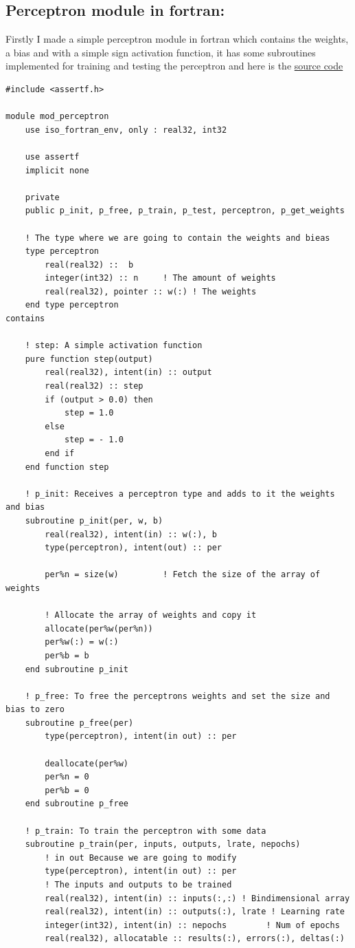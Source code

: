 \documentclass[12pt]{article}
\begin{document}
\subsection{Perceptron module in fortran:}
Firstly I made a simple perceptron module in fortran which contains the weights, a bias and with a
simple sign activation function, it has some subroutines implemented for training and testing the
perceptron and here is the
\href{https://github.com/alecksandr26/machine-learning-code/blob/main/src/mod_perceptron.f90}{source
  code}

\begin{lstlisting}
#include <assertf.h>

module mod_perceptron
    use iso_fortran_env, only : real32, int32
 
    use assertf
    implicit none

    private
    public p_init, p_free, p_train, p_test, perceptron, p_get_weights

    ! The type where we are going to contain the weights and bieas
    type perceptron
        real(real32) ::  b
        integer(int32) :: n     ! The amount of weights
        real(real32), pointer :: w(:) ! The weights
    end type perceptron
contains
    
    ! step: A simple activation function
    pure function step(output)
        real(real32), intent(in) :: output
        real(real32) :: step
        if (output > 0.0) then
            step = 1.0
        else
            step = - 1.0
        end if
    end function step
    
    ! p_init: Receives a perceptron type and adds to it the weights and bias
    subroutine p_init(per, w, b)
        real(real32), intent(in) :: w(:), b
        type(perceptron), intent(out) :: per

        per%n = size(w)         ! Fetch the size of the array of weights
        
        ! Allocate the array of weights and copy it
        allocate(per%w(per%n))
        per%w(:) = w(:)
        per%b = b
    end subroutine p_init

    ! p_free: To free the perceptrons weights and set the size and bias to zero
    subroutine p_free(per)
        type(perceptron), intent(in out) :: per
        
        deallocate(per%w)
        per%n = 0
        per%b = 0
    end subroutine p_free
        
    ! p_train: To train the perceptron with some data
    subroutine p_train(per, inputs, outputs, lrate, nepochs)
        ! in out Because we are going to modify
        type(perceptron), intent(in out) :: per 
        ! The inputs and outputs to be trained
        real(real32), intent(in) :: inputs(:,:) ! Bindimensional array
        real(real32), intent(in) :: outputs(:), lrate ! Learning rate
        integer(int32), intent(in) :: nepochs        ! Num of epochs
        real(real32), allocatable :: results(:), errors(:), deltas(:)


\end{lstlisting}
\end{document}
